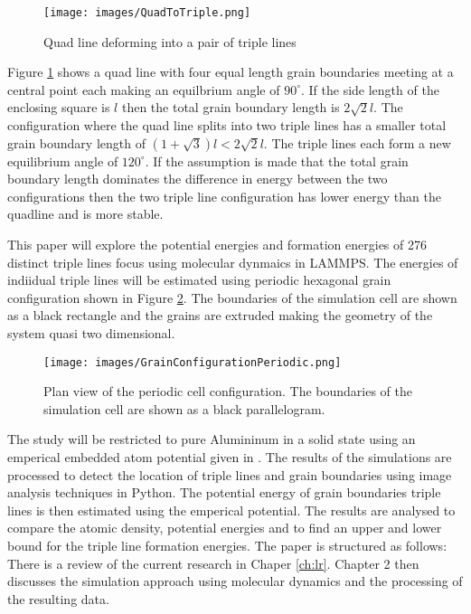 \documentclass[12pt,a4paper]{book}
\begin{document}
\begin{figure}[H]
	\centering
	\texttt{[image: images/QuadToTriple.png]} 
	\label{fig:QuadToTriple}
	\caption{Quad line deforming into a pair of triple lines}
\end{figure}

Figure \ref{fig:QuadToTriple} shows a quad line with four equal length grain boundaries meeting at a central point each making an equilbrium angle of $90^{\circ}$. If the side length of the enclosing square is $l$ then the total grain boundary length is $2\sqrt{2}l$. The configuration where the quad line splits into two triple lines has a smaller total grain boundary length of $(1 + \sqrt{3})l < 2\sqrt{2}l$. The triple lines each form a new equilibrium angle of $120^{\circ}$. If the assumption is made that the total grain boundary length dominates the difference in energy between the two configurations then the two triple line configuration has lower energy than the quadline and is more stable. 

This paper will explore the potential energies and formation energies of 276 distinct triple lines focus using molecular dynmaics in LAMMPS. The energies of indiidual triple lines will be estimated using periodic hexagonal grain configuration shown in Figure \ref{fig:PerCell}. The boundaries of the simulation cell are shown as a black rectangle and the grains are extruded making the geometry of the system quasi two dimensional.

\begin{figure}[H]
	\texttt{[image: images/GrainConfigurationPeriodic.png]}
	\label{fig:PerCell} 
	\caption{Plan view of the periodic cell configuration. The boundaries of the simulation cell are shown as a black parallelogram.}
\end{figure}

The study will be restricted to pure Alumininum in a solid state using an emperical embedded atom potential given in \cite{Zope2003}. The results of the simulations are processed to detect the location of triple lines and grain boundaries using image analysis techniques in Python. The potential energy of grain boundaries triple lines is then estimated using the emperical potential. The results are analysed to compare the atomic density, potential energies and to find an upper and lower bound for the triple line formation energies. The paper is structured as follows: There is a review of the current research in Chaper \ref{ch:lr}. Chapter 2 then discusses the simulation approach using molecular dynamics and the processing of the resulting data.   
\end{document}
